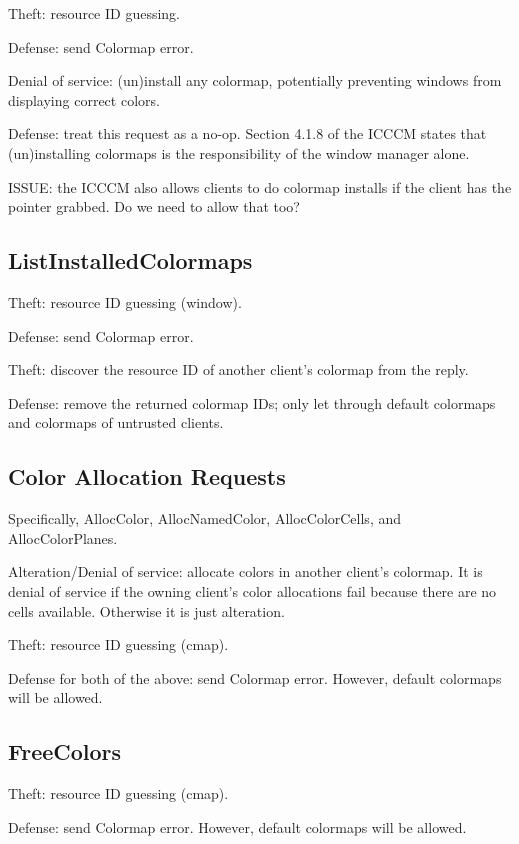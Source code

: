 Theft: resource ID guessing.

Defense: send Colormap error.

Denial of service: (un)install any colormap, potentially preventing
windows from displaying correct colors.

Defense: treat this request as a no-op.  Section 4.1.8 of the ICCCM
states that (un)installing colormaps is the responsibility of the window
manager alone.

ISSUE: the ICCCM also allows clients to do colormap installs if the
client has the pointer grabbed.  Do we need to allow that too?



\subsection{ListInstalledColormaps}

Theft: resource ID guessing (window).

Defense: send Colormap error.

Theft: discover the resource ID of another client's colormap
from the reply.

Defense: remove the returned colormap IDs; only let through default
colormaps and colormaps of untrusted clients.



\subsection{Color Allocation Requests}

Specifically, AllocColor, AllocNamedColor, AllocColorCells, and
AllocColorPlanes.

Alteration/Denial of service: allocate colors in another client's
colormap.  It is denial of service if the owning client's color
allocations fail because there are no cells available.  Otherwise it
is just alteration.

Theft: resource ID guessing (cmap).

Defense for both of the above: send Colormap error.  However, default
colormaps will be allowed.



\subsection{FreeColors}

Theft: resource ID guessing (cmap).

Defense: send Colormap error.  However, default colormaps will be
allowed.



